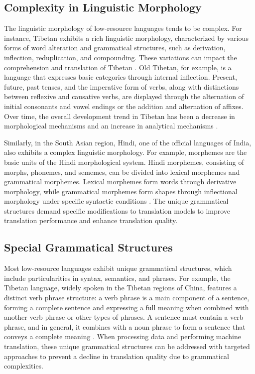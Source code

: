 \documentclass[acmsmall]{acmart}
\begin{document}
\subsection{Complexity in Linguistic Morphology}

The linguistic morphology of low-resource languages tends to be complex. For instance, Tibetan exhibits a rich linguistic morphology, characterized by various forms of word alteration and grammatical structures, such as derivation, inflection, reduplication, and compounding. These variations can impact the comprehension and translation of Tibetan \cite{2-1}. Old Tibetan, for example, is a language that expresses basic categories through internal inflection. Present, future, past tenses, and the imperative form of verbs, along with distinctions between reflexive and causative verbs, are displayed through the alternation of initial consonants and vowel endings or the addition and alternation of affixes. Over time, the overall development trend in Tibetan has been a decrease in morphological mechanisms and an increase in analytical mechanisms \cite{2-1-1}.

Similarly, in the South Asian region, Hindi, one of the official languages of India, also exhibits a complex linguistic morphology. For example, morphemes are the basic units of the Hindi morphological system. Hindi morphemes, consisting of morphs, phonemes, and sememes, can be divided into lexical morphemes and grammatical morphemes. Lexical morphemes form words through derivative morphology, while grammatical morphemes form shapes through inflectional morphology under specific syntactic conditions \cite{2-2}. The unique grammatical structures demand specific modifications to translation models to improve translation performance and enhance translation quality.



\subsection{Special Grammatical Structures}

Most low-resource languages exhibit unique grammatical structures, which include particularities in syntax, semantics, and phrases. For example, the Tibetan language, widely spoken in the Tibetan regions of China, features a distinct verb phrase structure: a verb phrase is a main component of a sentence, forming a complete sentence and expressing a full meaning when combined with another verb phrase or other types of phrases. A sentence must contain a verb phrase, and in general, it combines with a noun phrase to form a sentence that conveys a complete meaning \cite{2-3}. When processing data and performing machine translation, these unique grammatical structures can be addressed with targeted approaches to prevent a decline in translation quality due to grammatical complexities.
\end{document}
